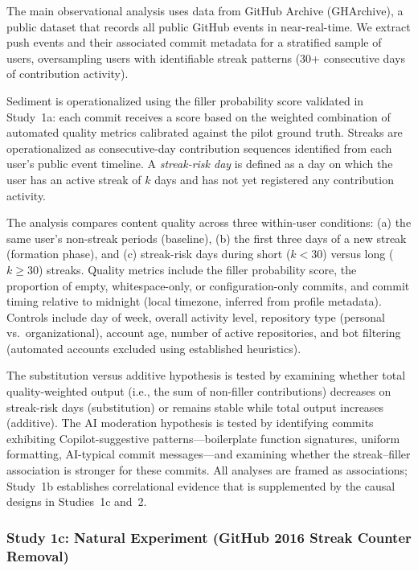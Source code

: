 \documentclass[12pt]{article}
\begin{document}
The main observational analysis uses data from GitHub Archive (GHArchive), a public dataset that records all public GitHub events in near-real-time. We extract push events and their associated commit metadata for a stratified sample of users, oversampling users with identifiable streak patterns (30+ consecutive days of contribution activity).

Sediment is operationalized using the filler probability score validated in Study~1a: each commit receives a score based on the weighted combination of automated quality metrics calibrated against the pilot ground truth. Streaks are operationalized as consecutive-day contribution sequences identified from each user's public event timeline. A \emph{streak-risk day} is defined as a day on which the user has an active streak of $k$ days and has not yet registered any contribution activity.

The analysis compares content quality across three within-user conditions: (a) the same user's non-streak periods (baseline), (b) the first three days of a new streak (formation phase), and (c) streak-risk days during short ($k < 30$) versus long ($k \geq 30$) streaks. Quality metrics include the filler probability score, the proportion of empty, whitespace-only, or configuration-only commits, and commit timing relative to midnight (local timezone, inferred from profile metadata). Controls include day of week, overall activity level, repository type (personal vs.\ organizational), account age, number of active repositories, and bot filtering (automated accounts excluded using established heuristics).

The substitution versus additive hypothesis is tested by examining whether total quality-weighted output (i.e., the sum of non-filler contributions) decreases on streak-risk days (substitution) or remains stable while total output increases (additive). The AI moderation hypothesis is tested by identifying commits exhibiting Copilot-suggestive patterns---boilerplate function signatures, uniform formatting, AI-typical commit messages---and examining whether the streak--filler association is stronger for these commits. All analyses are framed as associations; Study~1b establishes correlational evidence that is supplemented by the causal designs in Studies~1c and~2.

\subsubsection{Study 1c: Natural Experiment (GitHub 2016 Streak Counter Removal)}
\label{sec:study1c}
\end{document}

